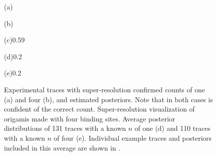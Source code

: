 \begin{figure}

  \begin{panel}{(a)}{\textwidth}
    \hspace{-2mm}%
    \setlength\plotwidth{\textwidth}%
    \setlength\plotheight{36mm}%
    
    \vspace{-4mm}
  \end{panel}

  \begin{panel}{(b)}{\textwidth}
    \hspace{-2mm}%
    \setlength\plotwidth{\textwidth}%
    \setlength\plotheight{36mm}%
    
    \vspace{-4mm}
  \end{panel}

  \begin{panel}{(c)}{0.59\textwidth}
    \vspace{6mm}%
    \hspace{4mm}%
    \setlength\plotwidth{22mm}%
  \end{panel}
  \begin{panel}{(d)}{0.2\textwidth}
    \hspace{2mm}%
    \def\plotwidth{0.8\textwidth}%
    \def\plotheight{20mm}%
  \end{panel}
  \begin{panel}{(e)}{0.2\textwidth}
    \hspace{2mm}%
    \def\plotwidth{0.8\textwidth}%
    \def\plotheight{20mm}%
  \end{panel}

  \caption{
     Experimental traces with super-resolution confirmed counts of one (a) and four (b), and 
    \ours estimated posteriors. Note that in both cases \ours is confident of the correct count. 
     Super-resolution visualization of origamis made with four binding sites.
     Average \ours posterior distributions of 131 traces with a known $n$ of one (d) and 
    110 traces with a known $n$ of four (e). Individual example traces and posteriors included in this 
    average are shown in .
  }
  \label{fig:results:experimental}
\end{figure}
